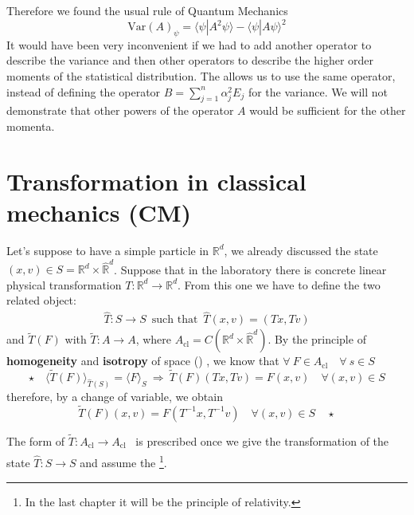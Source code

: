 \documentclass[../main.tex]{subfiles}
\begin{document}
Therefore we found the usual rule of Quantum Mechanics
\[
\textrm{Var}(A)_\psi= \langle \psi|A^2 \psi \rangle - \langle \psi|A \psi \rangle^2
\]
It would have been very inconvenient if we had to add another operator to describe the variance and then other operators to describe the higher order moments of the statistical distribution. The  allows us to use the same operator, instead of defining the operator $B=\sum_{j=1}^n\alpha_j^2E_j$ for the variance. We will not demonstrate that other powers of the operator $A$ would be sufficient for the other momenta.
\section[Transformation in CM]{Transformation in classical mechanics (CM)}
Let's suppose to have a simple particle in $\mathbb{R}^d$, we already discussed the state $(x,v)\in S=\mathbb{R}^d\times \hat{\mathbb{R}}^d$. Suppose that in the laboratory there is concrete linear physical transformation $T: \mathbb{R}^d\to\mathbb{R}^d$. From this one we have to define the two related object:
\begin{align*}
\hat{T}: S \rightarrow S \, \mbox{ such that } \, \hat{T}(x,v)=(Tx,Tv)
\end{align*}
and $\tilde{T}(F)$ with $\tilde{T}:A \rightarrow A$, where $A_{\textrm{cl}}=C(\mathbb{R}^d\times\hat{\mathbb{R}}^d)$. By the principle of \textbf{homogeneity} and \textbf{isotropy} of space () , we know that $\forall \ F \in A_{\textrm{cl}} \quad \forall \ s \in S$ 
\[
\star \quad \langle \tilde{T}(F) \rangle_{\hat{T}(S)}=\langle F \rangle_S \ \Rightarrow \ \tilde{T}(F)(Tx,Tv)=F(x,v) \quad \forall (x,v)\in S
\]
therefore, by a change of variable, we obtain $$\tilde{T}(F)(x,v)=F(T^{-1}x,T^{-1}v) \quad \forall (x,v)\in S \quad \star$$
\begin{kaobox}[frametitle=Moral]
The form of $\tilde{T}:A_{\textrm{cl}} \xrightarrow[]{} A_{\textrm{cl}}$ \, is prescribed once we give the transformation of the state $\hat{T}:S \rightarrow S$ and assume the \footnote{In the last chapter it will be the principle of relativity.}.
\end{kaobox}
\end{document}
